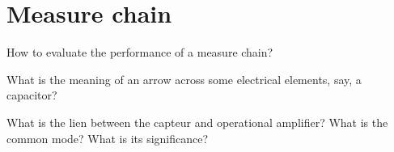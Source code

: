 \section{Measure chain}
How to evaluate the performance of a measure chain?

What is the meaning of an arrow across some electrical elements, say, a capacitor?

What is the lien between the capteur and operational amplifier? What is the common mode? What is its significance?